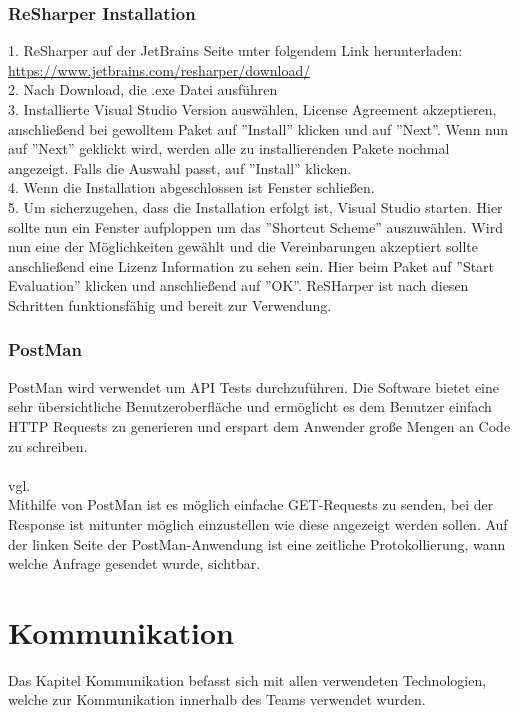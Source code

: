 \subsubsection{ReSharper Installation}
\label{sec:ReSharperInstallation}
1. ReSharper auf der JetBrains Seite unter folgendem Link herunterladen: \break \url {https://www.jetbrains.com/resharper/download/} \\
2. Nach Download, die .exe Datei ausführen \\
3. Installierte Visual Studio Version auswählen, License Agreement akzeptieren, anschließend bei gewolltem Paket auf ''Install'' klicken und auf ''Next''. 
Wenn nun auf ''Next'' geklickt wird, werden alle zu installierenden Pakete nochmal angezeigt. Falls die Auswahl passt, auf ''Install'' klicken. \\
4. Wenn die Installation abgeschlossen ist Fenster schließen. \\
5. Um sicherzugehen, dass die Installation erfolgt ist, Visual Studio starten. Hier sollte nun ein Fenster aufploppen um das ''Shortcut Scheme'' auszuwählen.
Wird nun eine der Möglichkeiten gewählt und die Vereinbarungen akzeptiert sollte anschließend eine Lizenz Information zu sehen sein. Hier beim Paket auf ''Start Evaluation'' klicken und anschließend auf ''OK''. ReSHarper ist nach diesen Schritten funktionsfähig und bereit zur Verwendung.
\subsubsection {PostMan}
\label{sec:PostMan}
PostMan wird verwendet um API Tests durchzuführen. Die Software bietet eine sehr übersichtliche Benutzeroberfläche und ermöglicht es dem Benutzer einfach HTTP Requests zu generieren und erspart dem Anwender große Mengen an Code zu schreiben. \\
\\vgl. \cite{TechnologiePostman} \\ \break
Mithilfe von PostMan ist es möglich einfache GET-Requests zu senden, bei der Response ist mitunter möglich einzustellen wie diese angezeigt werden sollen. Auf der linken Seite der PostMan-Anwendung ist eine zeitliche Protokollierung, wann welche Anfrage gesendet wurde, sichtbar.
\section{Kommunikation}
\label{sec:Kommunikation}
Das Kapitel Kommunikation befasst sich mit allen verwendeten Technologien, welche zur Kommunikation innerhalb des Teams verwendet wurden.
